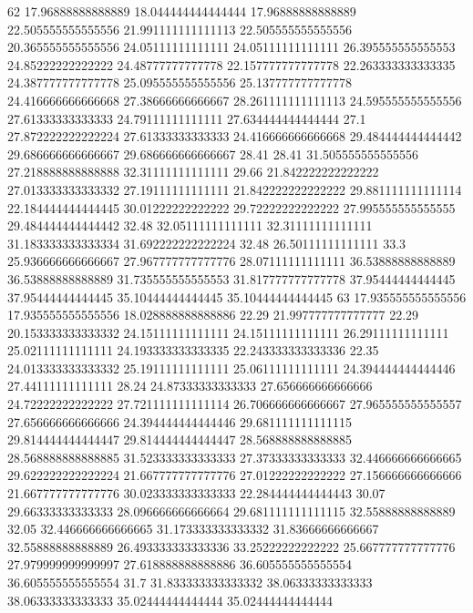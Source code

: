 62 17.96888888888889 18.044444444444444 17.96888888888889 22.505555555555556 21.991111111111113 22.505555555555556 20.365555555555556 24.05111111111111 24.05111111111111 26.395555555555553 24.85222222222222 24.48777777777778 22.157777777777778 22.263333333333335 24.387777777777778 25.095555555555556 25.137777777777778 24.416666666666668 27.38666666666667 28.261111111111113 24.595555555555556 27.61333333333333 24.79111111111111 27.634444444444444 27.1 27.872222222222224 27.61333333333333 24.416666666666668 29.484444444444442 29.686666666666667 29.686666666666667 28.41 28.41 31.505555555555556 27.218888888888888 32.31111111111111 29.66 21.842222222222222 27.013333333333332 27.19111111111111 21.842222222222222 29.881111111111114 22.184444444444445 30.01222222222222 29.72222222222222 27.995555555555555 29.484444444444442 32.48 32.05111111111111 32.31111111111111 31.183333333333334 31.692222222222224 32.48 26.50111111111111 33.3 25.936666666666667 27.967777777777776 28.07111111111111 36.53888888888889 36.53888888888889 31.735555555555553 31.817777777777778 37.95444444444445 37.95444444444445 35.10444444444445 35.10444444444445
63 17.935555555555556 17.935555555555556 18.028888888888886 22.29 21.997777777777777 22.29 20.153333333333332 24.15111111111111 24.15111111111111 26.29111111111111 25.02111111111111 24.193333333333335 22.243333333333336 22.35 24.013333333333332 25.19111111111111 25.06111111111111 24.394444444444446 27.44111111111111 28.24 24.87333333333333 27.656666666666666 24.72222222222222 27.721111111111114 26.706666666666667 27.965555555555557 27.656666666666666 24.394444444444446 29.681111111111115 29.814444444444447 29.814444444444447 28.568888888888885 28.568888888888885 31.523333333333333 27.37333333333333 32.446666666666665 29.622222222222224 21.667777777777776 27.01222222222222 27.156666666666666 21.667777777777776 30.023333333333333 22.284444444444443 30.07 29.66333333333333 28.096666666666664 29.681111111111115 32.55888888888889 32.05 32.446666666666665 31.173333333333332 31.83666666666667 32.55888888888889 26.493333333333336 33.25222222222222 25.667777777777776 27.979999999999997 27.618888888888886 36.605555555555554 36.605555555555554 31.7 31.833333333333332 38.06333333333333 38.06333333333333 35.02444444444444 35.02444444444444
